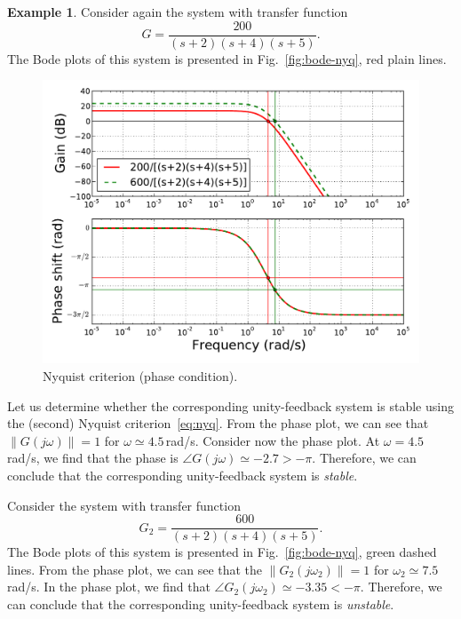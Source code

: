 \documentclass[a4paper,11pt]{report}
\theoremstyle{definition}
\newtheorem{mdexample}{Example}
\newenvironment{example}%
  {\vspace{0.1cm}\begin{mdframed}[backgroundcolor=lightgray]\begin{mdexample}}%
  {\end{mdexample}\end{mdframed}\vspace{0.1cm}}
\begin{document}
\begin{example}
  \label{ex:nyq2}
  Consider again the system with transfer function 
  \[
  G=\frac{200}{(s+2)(s+4)(s+5)}.
  \]
  The Bode plots of this system is presented in
  Fig.~\ref{fig:bode-nyq}, red plain lines.
  \begin{figure}[H]
    \centering
    \includegraphics[width=12cm]{fig/bode-nyq2.pdf}
    \caption{Nyquist criterion (phase condition).}
    \label{fig:bode-nyq2}
  \end{figure}

  Let us determine whether the corresponding unity-feedback system is
  stable using the (second) Nyquist criterion~\ref{eq:nyq}. From the
  phase plot, we can see that $\|G(j\omega)\| = 1$ for $\omega\simeq
  4.5$\,rad/s. Consider now the phase plot. At $\omega=4.5$\,rad/s, we
  find that the phase is $\angle G(j\omega)\simeq
  -2.7>-\pi$. Therefore, we can conclude that the corresponding
  unity-feedback system is \emph{stable}.

  Consider the system with transfer function 
  \[
  G_2=\frac{600}{(s+2)(s+4)(s+5)}.
  \]
  The Bode plots of this system is presented in
  Fig.~\ref{fig:bode-nyq}, green dashed lines. From the phase plot, we
  can see that the $\|G_2(j\omega_2)\| = 1$ for $\omega_2\simeq
  7.5$\,rad/s. In the phase plot, we find that $\angle
  G_2(j\omega_2)\simeq -3.35<-\pi$. Therefore, we can conclude that
  the corresponding unity-feedback system is \emph{unstable}.
\end{example}



\end{document}

